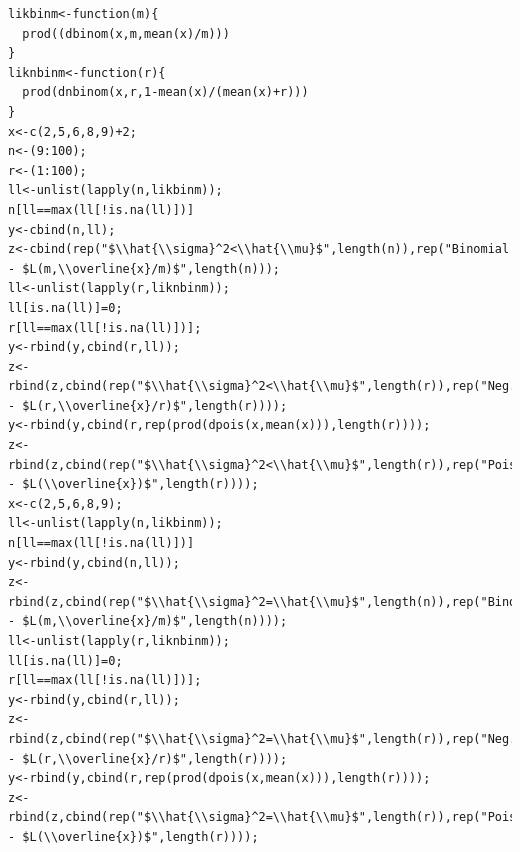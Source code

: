 \documentclass[]{book}
\theoremstyle{definition}
\theoremstyle{definition}
\theoremstyle{definition}
\theoremstyle{remark}
\begin{document}
\hypertarget{toggleCodeFreq.2}{}
\begin{verbatim}
likbinm<-function(m){
  prod((dbinom(x,m,mean(x)/m)))
}
liknbinm<-function(r){
  prod(dnbinom(x,r,1-mean(x)/(mean(x)+r)))
}
x<-c(2,5,6,8,9)+2;
n<-(9:100);
r<-(1:100);
ll<-unlist(lapply(n,likbinm));
n[ll==max(ll[!is.na(ll)])]
y<-cbind(n,ll);
z<-cbind(rep("$\\hat{\\sigma}^2<\\hat{\\mu}$",length(n)),rep("Binomial - $L(m,\\overline{x}/m)$",length(n)));
ll<-unlist(lapply(r,liknbinm));
ll[is.na(ll)]=0;
r[ll==max(ll[!is.na(ll)])];
y<-rbind(y,cbind(r,ll));
z<-rbind(z,cbind(rep("$\\hat{\\sigma}^2<\\hat{\\mu}$",length(r)),rep("Neg.binomial - $L(r,\\overline{x}/r)$",length(r))));
y<-rbind(y,cbind(r,rep(prod(dpois(x,mean(x))),length(r))));
z<-rbind(z,cbind(rep("$\\hat{\\sigma}^2<\\hat{\\mu}$",length(r)),rep("Poisson - $L(\\overline{x})$",length(r))));
x<-c(2,5,6,8,9);
ll<-unlist(lapply(n,likbinm));
n[ll==max(ll[!is.na(ll)])]
y<-rbind(y,cbind(n,ll));
z<-rbind(z,cbind(rep("$\\hat{\\sigma}^2=\\hat{\\mu}$",length(n)),rep("Binomial - $L(m,\\overline{x}/m)$",length(n))));
ll<-unlist(lapply(r,liknbinm));
ll[is.na(ll)]=0;
r[ll==max(ll[!is.na(ll)])];
y<-rbind(y,cbind(r,ll));
z<-rbind(z,cbind(rep("$\\hat{\\sigma}^2=\\hat{\\mu}$",length(r)),rep("Neg.binomial - $L(r,\\overline{x}/r)$",length(r))));
y<-rbind(y,cbind(r,rep(prod(dpois(x,mean(x))),length(r))));
z<-rbind(z,cbind(rep("$\\hat{\\sigma}^2=\\hat{\\mu}$",length(r)),rep("Poisson - $L(\\overline{x})$",length(r))));

\end{verbatim}
\end{document}
